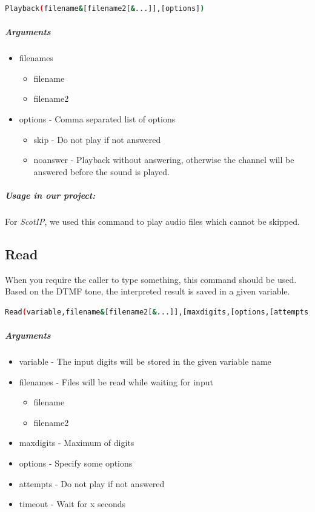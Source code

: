 \begin{lstlisting}[language=bash,caption={Syntax of application Playback}]
Playback(filename&[filename2[&...]],[options])
\end{lstlisting}

\subparagraph{Arguments}
\begin{itemize}

	\item filenames
	\begin{itemize}
		\item filename
		\item filename2
	\end{itemize}
	
	\item options - Comma separated list of options
		\begin{itemize}
		\item skip - Do not play if not answered
		\item noanswer - Playback without answering, otherwise the channel will be answered before the sound is played.
		\end{itemize}
\end{itemize}

\subparagraph{Usage in our project:}
For \textit{ScotIP}, we used this command to play audio files which cannot be skipped.  




\subsection{Read}
When you require the caller to type something, this command should be used. Based on the DTMF tone, the interpreted result is saved in a given variable. 


\begin{lstlisting}[language=bash,caption={Syntax of application Read}]
Read(variable,filename&[filename2[&...]],[maxdigits,[options,[attempts,[timeout]]]]])
\end{lstlisting}

\subparagraph{Arguments}
\begin{itemize}
	\item variable - The input digits will be stored in the given variable name
	\item filenames - Files will be read while waiting for input
	\begin{itemize}
		\item filename
		\item filename2
	\end{itemize}
	
	\item maxdigits - Maximum of digits
	\item options - Specify some options
	\item attempts - Do not play if not answered
	\item timeout - Wait for x seconds
\end{itemize}

